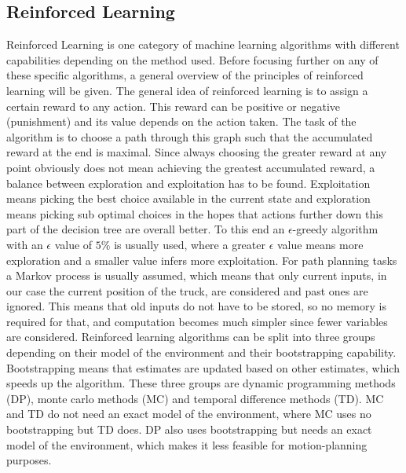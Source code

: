 \subsection{Reinforced Learning}
\label{sec:reinforced_learning}

Reinforced Learning is one category of machine learning algorithms with different capabilities depending on the method used. Before focusing further on any of these specific algorithms, a general overview of the principles of reinforced learning will be given. The general idea of reinforced learning is to assign a certain reward to any action. This reward can be positive or negative (punishment) and its value depends on the action taken. The task of the algorithm is to choose a path through this graph such that the accumulated reward at the end is maximal. Since always choosing the greater reward at any point obviously does not mean achieving the greatest accumulated reward, a balance between exploration and exploitation has to be found. Exploitation means picking the best choice available in the current state and exploration means picking sub optimal choices in the hopes that actions further down this part of the decision tree are overall better. To this end an $\epsilon$-greedy algorithm with an $\epsilon$ value of $5\%$ is usually used, where a greater $\epsilon$ value means more exploration and a smaller value infers more exploitation. For path planning tasks a Markov process is usually assumed, which means that only current inputs, in our case the current position of the truck, are considered and past ones are ignored. This means that old inputs do not have to be stored, so no memory is required for that, and computation becomes much simpler since fewer variables are considered. Reinforced learning algorithms can be split into three groups depending on their model of the environment and their bootstrapping capability. Bootstrapping means that estimates are updated based on other estimates, which speeds up the algorithm. These three groups are dynamic programming methods (DP), monte carlo methods (MC) and temporal difference methods (TD). MC and TD do not need an exact model of the environment, where MC uses no bootstrapping but TD does. DP also uses bootstrapping but needs an exact model of the environment, which makes it less feasible for motion-planning purposes.
